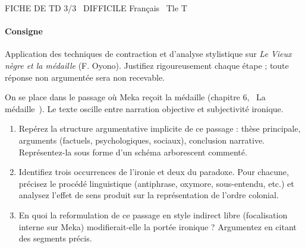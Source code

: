 \documentclass[11pt]{article}
\begin{document}
\begin{tcolorbox}[enhanced,colback=popink,colframe=popink,arc=10pt,boxrule=0pt,left=12pt,right=12pt,top=9pt,bottom=9pt]
{\color{white}\popxbold\small FICHE DE TD 3/3 \textbullet\ DIFFICILE \hfill Français \textbullet\ Tle T\par}
\end{tcolorbox}
\vspace{4pt}
\paragraph{Consigne} Application des techniques de contraction et d’analyse stylistique sur \textit{Le Vieux nègre et la médaille} (F. Oyono). Justifiez rigoureusement chaque étape ; toute réponse non argumentée sera non recevable.

\begin{exercice}
On se place dans le passage où Meka reçoit la médaille (chapitre 6, \og~La médaille~\fg{}). Le texte oscille entre narration objective et subjectivité ironique.
\begin{enumerate}
    \item Repérez la structure argumentative implicite de ce passage : thèse principale, arguments (factuels, psychologiques, sociaux), conclusion narrative. Représentez-la sous forme d’un schéma arborescent commenté.
    \item Identifiez trois occurrences de l’ironie et deux du paradoxe. Pour chacune, précisez le procédé linguistique (antiphrase, oxymore, sous-entendu, etc.) et analysez l’effet de sens produit sur la représentation de l’ordre colonial.
    \item En quoi la reformulation de ce passage en style indirect libre (focalisation interne sur Meka) modifierait-elle la portée ironique ? Argumentez en citant des segments précis.
\end{enumerate}
\end{exercice}
\end{document}
